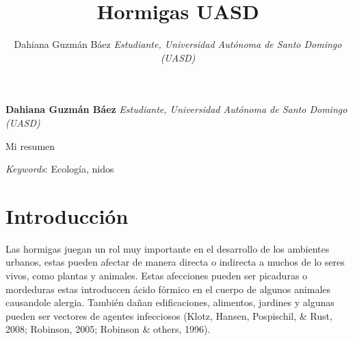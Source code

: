 \documentclass[11pt,]{article}
\title{Hormigas UASD  }
\author{\Large Dahiana Guzmán Báez\vspace{0.05in} \newline\normalsize\emph{Estudiante, Universidad Autónoma de Santo Domingo (UASD)}  }
\date{}
\newcommand*{\authorfont}{\fontfamily{phv}\selectfont}
\renewenvironment{abstract}
 {{%
    \setlength{\leftmargin}{0mm}
    \setlength{\rightmargin}{\leftmargin}%
  }%
  \relax}
 {\endlist}
\begin{document}
	
%

{%
\setlength{\parindent}{0pt}
\thispagestyle{plain}
{\fontsize{18}{20}\selectfont\raggedright 
\maketitle  %

}

{
   \vskip 13.5pt\relax \normalsize\fontsize{11}{12} 
\textbf{\authorfont Dahiana Guzmán Báez} \hskip 15pt \emph{\small Estudiante, Universidad Autónoma de Santo Domingo (UASD)}   

}

}








\begin{abstract}

    \hbox{\vrule height .2pt width 39.14pc}

    \vskip 8.5pt %

\noindent Mi resumen


\vskip 8.5pt \noindent \emph{Keywords}: Ecología, nidos \par

    \hbox{\vrule height .2pt width 39.14pc}



\end{abstract}


\vskip 6.5pt


\noindent  \section{Introducción}\label{introducciuxf3n}

Las hormigas juegan un rol muy importante en el desarrollo de los
ambientes urbanos, estas pueden afectar de manera directa o indirecta a
muchos de lo seres vivos, como plantas y animales. Estas afecciones
pueden ser picaduras o mordeduras estas introduccen ácido fórmico en el
cuerpo de algunos animales causandole alergia. También dañan
edificaciones, alimentos, jardines y algunas pueden ser vectores de
agentes infecciosos (Klotz, Hansen, Pospischil, \& Rust, 2008; Robinson,
2005; Robinson \& others, 1996).
\end{document}
